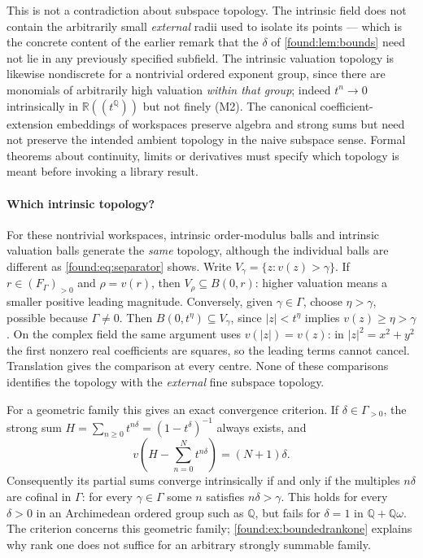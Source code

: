 \documentclass[11pt,letterpaper]{article}
\numberwithin{equation}{section}
\theoremstyle{definition}
\theoremstyle{remark}
\newcommand{\R}{\mathbb R}
\newcommand{\Q}{\mathbb Q}
\begin{document}
This is not a contradiction about subspace topology. The intrinsic field does
not contain the arbitrarily small \emph{external} radii used to isolate its
points --- which is the concrete content of the earlier remark that the $\delta$
of \cref{found:lem:bounds} need not lie in any previously specified subfield.
The intrinsic valuation topology is likewise nondiscrete for a nontrivial
ordered exponent group, since there are monomials of arbitrarily high valuation
\emph{within that group}; indeed $t^n\to0$ intrinsically in $\R((t^\Q))$ but not
finely (M2). The canonical coefficient-extension embeddings of workspaces
preserve algebra and strong sums but need not preserve the intended ambient
topology in the naive subspace sense.
Formal theorems about continuity, limits or derivatives must specify which
topology is meant before invoking a library result.

\paragraph{Which intrinsic topology?}
For these nontrivial workspaces, intrinsic order-modulus balls and intrinsic
valuation balls generate the \emph{same} topology, although the individual
balls are different as \cref{found:eq:separator} shows. Write
$V_\gamma=\{z:v(z)>\gamma\}$. If $r\in(F_\Gamma)_{>0}$ and
$\rho=v(r)$, then $V_\rho\subseteq B(0,r)$: higher valuation means a smaller
positive leading magnitude. Conversely, given $\gamma\in\Gamma$, choose
$\eta>\gamma$, possible because $\Gamma\ne0$. Then
$B(0,t^\eta)\subseteq V_\gamma$, since $|z|<t^\eta$ implies
$v(z)\ge\eta>\gamma$. On the complex field the same argument uses
$v(|z|)=v(z)$: in $|z|^2=x^2+y^2$ the first nonzero real coefficients are
squares, so the leading terms cannot cancel. Translation gives the comparison
at every centre. None of these comparisons identifies the topology with the
\emph{external} fine subspace topology.

For a geometric family this gives an exact convergence criterion. If
$\delta\in\Gamma_{>0}$, the strong sum
$H=\sum_{n\ge0}t^{n\delta}=(1-t^\delta)^{-1}$ always exists, and
\[
 v\!\left(H-\sum_{n=0}^N t^{n\delta}\right)=(N+1)\delta.
\]
Consequently its partial sums converge intrinsically if and only if the
multiples $n\delta$ are cofinal in $\Gamma$: for every $\gamma\in\Gamma$
some $n$ satisfies $n\delta>\gamma$. This holds for every $\delta>0$ in an
Archimedean ordered group such as $\Q$, but fails for $\delta=1$ in
$\Q+\Q\omega$. The criterion concerns this geometric family;
\cref{found:ex:boundedrankone} explains why rank one does not suffice for an
arbitrary strongly summable family.
\end{document}
